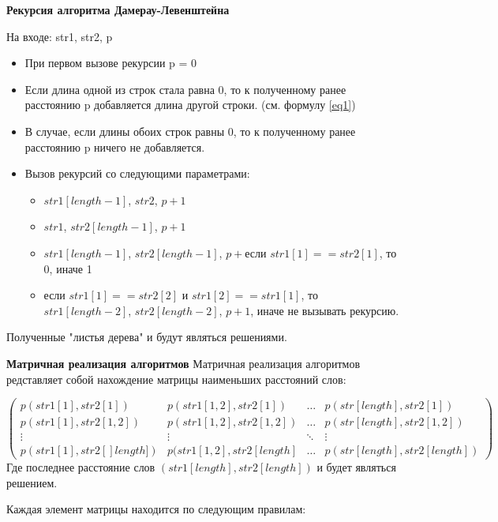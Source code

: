 \documentclass[12pt]{report}
\begin{document}
	{\bf Рекурсия алгоритма Дамерау-Левенштейна}
	
	На входе: str1, str2, p
	\begin{itemize}
		\item При первом вызове рекурсии p = 0
		\item Если длина одной из строк стала равна 0, то к полученному ранее расстоянию p добавляется длина другой строки.  (см. формулу \ref{eq1})
		\item В случае, если длины обоих строк равны 0, то к полученному ранее расстоянию p ничего не добавляется.
		\item Вызов рекурсий со следующими параметрами:
		\begin{itemize}
			\item $str1[length - 1]$, $str2$, $p + 1$
			\item $str1$, $str2[length - 1]$, $p + 1$
			\item $str1[length - 1]$, $str2[length - 1]$, $p + $если $str1[1] == str2[1]$, то 0, иначе 1
			\item если $str1[1] == str2[2]$ и $str1[2] == str1[1]$, то $str1[length - 2]$, $str2[length - 2]$, $p + 1$, иначе не вызывать рекурсию.
		\end{itemize}
	\end{itemize}

    Полученные "листья дерева" и будут являться решениями.
    \newpage
    
    {\bf Матричная реализация алгоритмов}
    Матричная реализация алгоритмов редставляет собой нахождение матрицы наименьших расстояний слов:
    
    \begin{equation}
    \left(
     \begin{array}{cccc}
    	p(str1[1], str2[1]) & p(str1[1, 2], str2[1]) & \ldots & p(str[length], str2[1])\\
    	p(str1[1], str2[1,2]) & p(str1[1, 2], str2[1,2]) & \ldots & p(str[length], str2[1,2])\\
    	\vdots & \vdots & \ddots & \vdots\\
    	p(str1[1], str2[]length]) & p(str1[1, 2], str2[length] & \ldots & p(str[length], str2[length])
    \end{array}
    \right)
    \end{equation}
    Где последнее расстояние слов $(str1[length], str2[length])$ и будет являться решением.
    
    Каждая элемент матрицы находится по следующим правилам:
    
\end{document}
